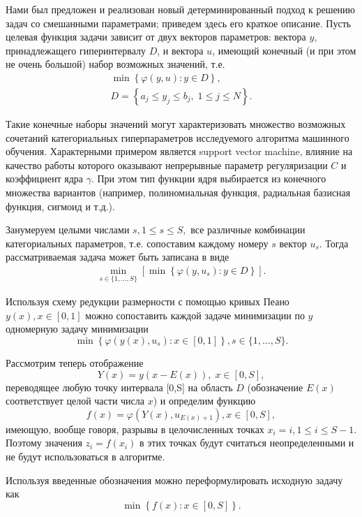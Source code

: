 \documentclass[preprint,12pt]{elsarticle}
\begin{document}
Нами был предложен и реализован новый детерминированный подход к решению задач со смешанными параметрами; приведем здесь его краткое описание. 
Пусть  целевая функция задачи зависит от двух векторов параметров: вектора $y$, принадлежащего гиперинтервалу $D$, и вектора $u$, имеющий конечный (и при этом не очень большой) набор возможных значений, т.е. 
\begin{gather}\label{problem_i}
\min{\left\{ \varphi(y,u) : y\in D \right\}},\\
D=\left\{a_j \leq y_j \leq b_j, \; 1\leq j \leq N \right\}.\nonumber
\end{gather}

Такие конечные наборы значений могут характеризовать множество возможных сочетаний категориальных гиперпараметров исследуемого алгоритма машинного обучения. 
Характерными примером является support vector machine, влияние на качество работы которого оказывают непрерывные параметр регуляризации $C$ и коэффициент ядра $\gamma$. При этом тип функции ядря выбирается из конечного множества вариантов (например, полиномиальная функция, радиальная базисная функция, сигмоид и т.д.).

Занумеруем целыми числами $s, 1\leq s \leq S,$ все различные комбинации категориальных параметров, т.е. сопоставим каждому номеру $s$ вектор $u_s$. 
Тогда рассматриваемая задача может быть записана в виде 
\begin{gather}\label{problem_is}
 \min_{s\in\{1,...,S\}}\left[\min{\left\{ \varphi(y,u_s) : y\in D \right\}}\right].
\end{gather}

Используя схему редукции размерности с помощью кривых Пеано $y(x), x\in [0,1]$ можно сопоставить каждой задаче минимизации по $y$ одномерную задачу минимизации
\[
 \min{\left\{ \varphi(y(x),u_s): x \in [0,1] \right\}}, s \in \{1,...,S\}.
\]

Рассмотрим теперь отображение 
\[
Y(x)=y(x-E(x)), \; x\in[0,S],
\]
переводящее любую точку интервала [0,S] на область $D$ (обозначение $E(x)$ соответствует целой части числа $x$) и определим функцию 
\[
f(x) = \varphi(Y(x),u_{E(x)+1}), x\in[0,S],
\]
имеющую, вообще говоря, разрывы в целочисленных точках $x_i = i, 1\leq i \leq S-1$.
Поэтому значения  $z_i = f(x_i)$ в этих точках будут считаться неопределенными и не будут использоваться в алгоритме.

Используя введенные обозначения можно переформулировать исходную задачу как
\begin{equation}\label{problem_is1}
\min \left\{f(x): x \in [0,S] \right\}.
\end{equation}
\end{document}
